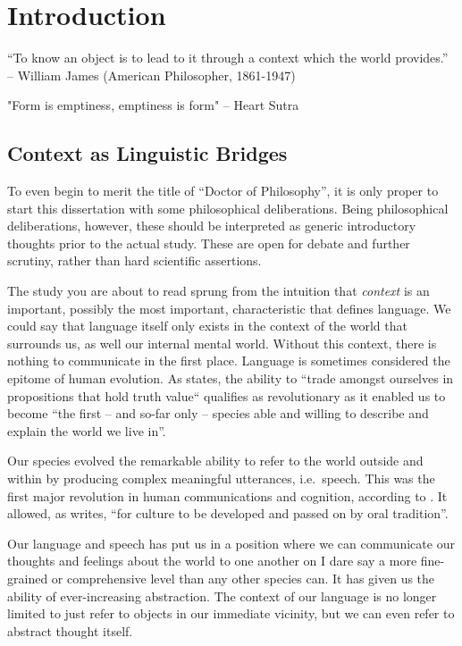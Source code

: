 \chapter{Introduction}
\label{chap:intro}

“To know an object is to lead to it through a context which the world provides.” -- William James (American Philosopher, 1861-1947)

"Form is emptiness, emptiness is form" -- Heart Sutra

\section{Context as Linguistic Bridges}


To even begin to merit the title of ``Doctor of Philosophy'', it is only proper to start this dissertation with some
philosophical deliberations. Being philosophical deliberations, however, these should be interpreted as generic
introductory thoughts prior to the actual study. These are open for debate and further scrutiny, rather than hard
scientific assertions.

The study you are about to read sprung from the intuition that \emph{context}
is an important, possibly the most important, characteristic that defines
language. We could say that language itself only exists in the context of the world that
surrounds us, as well our internal mental world. Without this context, there is
nothing to communicate in the first place. Language is sometimes considered the
epitome of human evolution. As \cite{HARNAD91} states, the ability to ``trade amongst ourselves in propositions that hold truth value`` qualifies as revolutionary as it enabled us to become ``the first -- and so-far only -- species able and willing to describe and
explain the world we live in''.

Our species evolved the remarkable ability to refer to the world outside and within by producing complex meaningful
utterances, i.e.\ speech.  This was the first major revolution in human communications and cognition, according to
\cite{HARNAD91}. It allowed, as \cite{HARNAD91} writes, ``for culture to be developed and passed on by oral tradition''.

Our language and speech has put us in a position where we can communicate our thoughts and feelings about the world
to one another on I dare say a more fine-grained or comprehensive level than any other species can. It has given us the
ability of ever-increasing abstraction. The context of our language is no longer limited to just refer to objects in our
immediate vicinity, but we can even refer to abstract thought itself.

